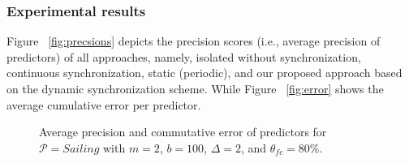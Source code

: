\subsubsection*{Experimental results} Figure ~\ref{fig:precsions} depicts the precision scores 
(i.e., average precision of predictors)  of all approaches, namely, isolated without synchronization, continuous synchronization, static (periodic), and our proposed approach based on the dynamic synchronization scheme. While Figure ~\ref{fig:error} shows the average cumulative error per predictor.       



\begin{figure}[]
	\begin{centering}
		\hfill
		
		\caption{Average precision and commutative error of predictors for $\mathcal{P}=Sailing$ with $m=2$, $b=100$,  $\Delta=2$, and $\theta_{fc}=80\%$.}
		\label{fig:error_precsions}
	\end{centering}
\end{figure}


